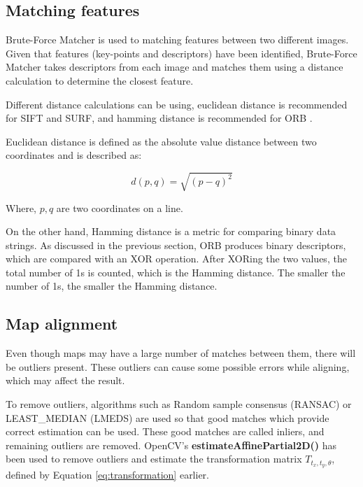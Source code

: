 \subsection{Matching features}

Brute-Force Matcher is used to matching features between two different images. Given that features (key-points and descriptors) have been identified, Brute-Force Matcher takes descriptors from each image and matches them using a distance calculation to determine the closest feature.

Different distance calculations can be using, euclidean distance is recommended for SIFT and SURF, and hamming distance is recommended for ORB \cite{itseez2015opencv}.

Euclidean distance is defined as the absolute value distance between two coordinates and is described as:

\begin{equation}
    d(p,q) = \sqrt{(p - q)^2}
\label{eq:euclidean_distance}
\end{equation}

Where, $p, q$ are two coordinates on a line. 

On the other hand, Hamming distance is a metric for comparing binary data strings. As discussed in the previous section, ORB produces binary descriptors, which are compared with an XOR operation. After XORing the two values, the total number of 1s is counted, which is the Hamming distance. The smaller the number of 1s, the smaller the Hamming distance.

\subsection{Map alignment}
\label{subsec:map_alignment}

Even though maps may have a large number of matches between them, there will be outliers present. These outliers can cause some possible errors while aligning, which may affect the result. 

To remove outliers, algorithms such as Random sample consensus (RANSAC) or LEAST\_MEDIAN (LMEDS) are used so that good matches which provide correct estimation can be used. These good matches are called inliers, and remaining outliers are removed. OpenCV's \textbf{estimateAffinePartial2D()} has been used to remove outliers and estimate the transformation matrix $T_{t_x, t_y, \theta}$, defined by Equation \ref{eq:transformation} earlier.

